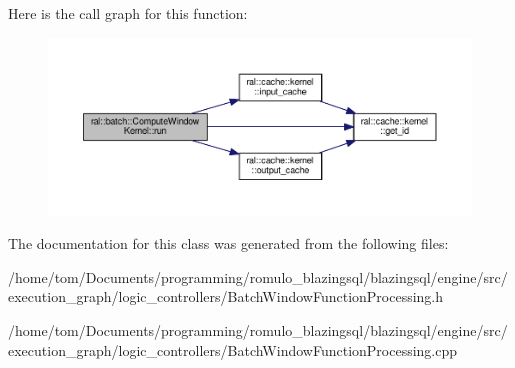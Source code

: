 Here is the call graph for this function\+:\nopagebreak
\begin{figure}[H]
\begin{center}
\leavevmode
\includegraphics[width=350pt]{classral_1_1batch_1_1ComputeWindowKernel_a22a36fbcb21dad09bad9300e21dc4825_cgraph}
\end{center}
\end{figure}


The documentation for this class was generated from the following files\+:\begin{DoxyCompactItemize}
\item 
/home/tom/\+Documents/programming/romulo\+\_\+blazingsql/blazingsql/engine/src/execution\+\_\+graph/logic\+\_\+controllers/Batch\+Window\+Function\+Processing.\+h\item 
/home/tom/\+Documents/programming/romulo\+\_\+blazingsql/blazingsql/engine/src/execution\+\_\+graph/logic\+\_\+controllers/Batch\+Window\+Function\+Processing.\+cpp\end{DoxyCompactItemize}
